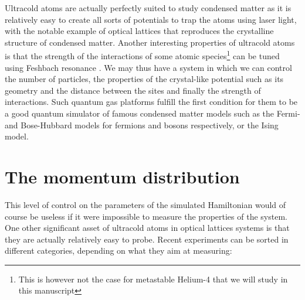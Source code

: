 Ultracold atoms are actually perfectly suited to study condensed matter as it is relatively easy to create all sorts of potentials to trap the atoms using laser light, with the notable example of optical lattices \cite{bloch2005ultracold} that reproduces the crystalline structure of condensed matter. Another interesting properties of ultracold atoms is that the strength of the interactions of some atomic species\footnote{This is however not the case for metastable Helium-4 that we will study in this manuscript} can be tuned using Feshbach resonance \cite{chin2010feshbach,feshbach1958unified}. We may thus have a system in which we can control the number of particles, the properties of the crystal-like potential such as its geometry and the distance between the sites and finally the strength of interactions. Such quantum gas platforms fulfill the first condition for them to be a good quantum simulator of famous condensed matter models such as the Fermi- and Bose-Hubbard models for fermions and bosons respectively, or the Ising model. 

\section*{The momentum distribution}

This level of control on the parameters of the simulated Hamiltonian would of course be useless if it were impossible to measure the properties of the system. One other significant asset of ultracold atoms in optical lattices systems is that they are actually relatively easy to probe. Recent experiments can be sorted in different categories, depending on what they aim at measuring:

